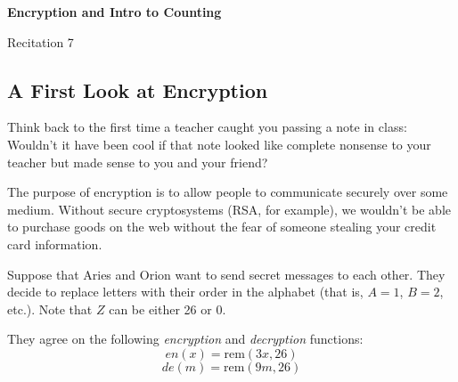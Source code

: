\documentclass[12pt,letterpaper]{article}
\begin{document}
  \thispagestyle{firstpagestyle}
  \begin{center}
    {\large \textbf{Encryption and Intro to Counting}}
    
    {\large Recitation 7}
  \end{center}
   
   \subsection*{A First Look at Encryption}
   
   Think back to the first time a teacher caught you passing a note in class: Wouldn’t it have been cool if that note looked like complete nonsense to your teacher but made sense to you and your friend? 
   

   The purpose of encryption is to allow people to communicate securely over some medium. Without secure cryptosystems (RSA, for example), we wouldn’t be able to purchase goods on the web without the fear of someone stealing your credit card information. 
   
   Suppose that Aries and Orion want to send secret messages to each other. They decide to replace letters with their order in the alphabet (that is, $A = 1$, $B = 2$, etc.). Note that $Z$ can be either 26 or 0.

    They agree on the following \textit{encryption} and \textit{decryption} functions:
    \[en(x) = \textrm{rem}(3x, 26)\]
    \[de(m) =  \textrm{rem}(9m, 26)\]
    
\end{document}
